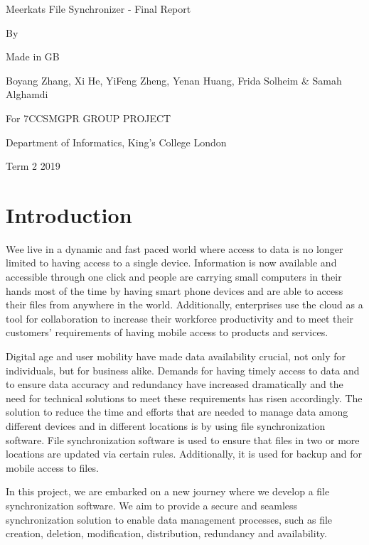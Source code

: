 \documentclass{article}
\begin{document}
\begin{center}
\thispagestyle{empty}
\parskip=14pt%
\vspace*{3\parskip}%
Meerkats File Synchronizer - Final Report

By

Made in GB

Boyang Zhang, Xi He, YiFeng Zheng,
 Yenan Huang, Frida Solheim \& Samah Alghamdi

For 7CCSMGPR GROUP PROJECT

Department of Informatics, King's College London

Term 2 2019
\end{center}
\newpage


\tableofcontents
\newpage

\section{Introduction}
Wee live in a dynamic and fast paced world where access to data is no longer limited to having access to a single device. Information is now available and accessible through one click and people are carrying small computers in their hands most of the time by having smart phone devices and are able to access their files from anywhere in the world. Additionally, enterprises use the cloud as a tool for collaboration to increase their workforce productivity and to meet their customers’ requirements of having mobile access to products and services.

Digital age and user mobility have made data availability crucial, not only for individuals, but for business alike. Demands for having timely access to data and to ensure data accuracy and redundancy have increased dramatically and the need for technical solutions to meet these requirements has risen accordingly. The solution to reduce the time and efforts that are needed to manage data among different devices and in different locations is by using file synchronization software. File synchronization software is used to ensure that files in two or more locations are updated via certain rules. Additionally, it is used for backup and for mobile access to files.


\hfill \break
In this project, we are embarked on a new journey where we develop a file synchronization software. We aim to provide a secure and seamless synchronization solution to enable data management processes, such as file creation, deletion, modification, distribution, redundancy and availability.
\end{document}
